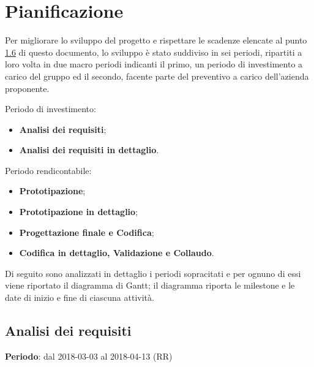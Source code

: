 \newpage
\section{Pianificazione}

Per migliorare lo sviluppo del progetto e rispettare le scadenze elencate al punto \hyperref[Scadenze]{1.6} di questo documento, lo sviluppo è stato suddiviso in sei periodi, ripartiti a loro volta in due macro periodi indicanti il primo, un periodo di investimento a carico del gruppo \Gruppo{} ed il secondo, facente parte del preventivo a carico dell'azienda proponente.

Periodo di investimento:
\begin{itemize}
\item \textbf{Analisi dei requisiti};
\item \textbf{Analisi dei requisiti in dettaglio}.
\end{itemize}
Periodo rendicontabile:
\begin{itemize}
\item \textbf{Prototipazione};
\item \textbf{Prototipazione in dettaglio};
\item \textbf{Progettazione finale e Codifica};
\item \textbf{Codifica in dettaglio, Validazione e Collaudo}.
\end{itemize}
Di seguito sono analizzati in dettaglio i periodi sopracitati e per ognuno di essi viene riportato il diagramma di Gantt; il diagramma riporta le milestone e le date di inizio e fine di ciascuna attività.

\subsection{Analisi dei requisiti}
\textbf{Periodo}: dal 2018-03-03 al 2018-04-13 (RR)\\

